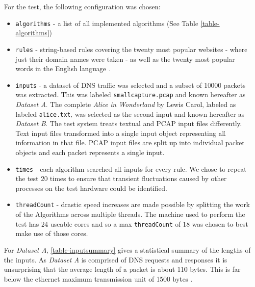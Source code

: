 \documentclass[9pt, technote]{IEEEtran}
\begin{document}
For the test, the following configuration was chosen:
\begin{itemize}
  \item \texttt{algorithms} - a list of all implemented algorithms (See Table \ref{table-algorithms}) 
  \item \texttt{rules} - string-based rules covering the twenty most popular websites \citep{alexa2016} - where just their domain names were taken - as well as the twenty most popular words in the English language \citep{oed2016}.
  \item \texttt{inputs} - a dataset of DNS traffic was selected and a subset of 10000 packets was extracted. This was labeled \texttt{smallcapture.pcap} and known hereafter as \textit{Dataset A}. The complete \textit{Alice in Wonderland} by Lewis Carol, labeled as labeled \texttt{alice.txt}, was selected as the second input and known hereafter as \textit{Dataset B}. The test system treats textual and PCAP input files differently. Text input files transformed into a single input object representing all information in that file. PCAP input files are split up into individual packet objects and each packet represents a single input.
  \item \texttt{times} - each algorithm searched all inputs for every rule. We chose to repeat the test 20 times to ensure that transient fluctuations caused by other processes on the test hardware could be identified.
  \item \texttt{threadCount} - drastic speed increases are made possible by splitting the work of the Algorithms across multiple threads. The machine used to perform the test has 24 useable cores and so a max \texttt{threadCount} of 18 was chosen to best make use of those cores. 
\end{itemize}


For \textit{Dataset A}, \ref{table-inputsummary} gives a statistical summary of the lengths of the inputs. As \textit{Dataset A} is comprised of DNS requests and responses it is unsurprising that the average length of a packet is about 110 bytes. This is far below the ethernet maximum transmission unit of 1500 bytes \citep{rfc894}. 

\begin{table}[!htb]
  \centering
  \caption{\textit{Dataset A} packet length statistical summary (in bytes).}
  \label{table-inputsummary}
\end{table}
\end{document}
